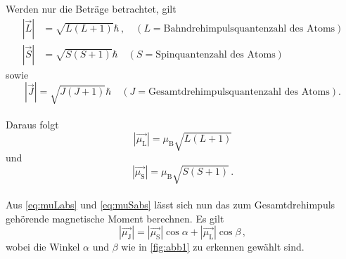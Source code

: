Werden nur die Beträge betrachtet, gilt
\begin{align}
    |\vec{L}| &= \sqrt{L(L + 1)} \hbar \,, \quad (L = \text{Bahndrehimpulsquantenzahl des Atoms}) 
    \label{eq:Labs} \\
    |\vec{S}| &= \sqrt{S(S + 1)} \hbar \quad (S = \text{Spinquantenzahl des Atoms})
    \label{eq:Sabs}
\end{align}
sowie
\begin{equation*}
    |\vec{J}| = \sqrt{J(J + 1)} \hbar \quad (J = \text{Gesamtdrehimpulsquantenzahl des Atoms}).
    \label{eq:Jabs}
\end{equation*} \\

Daraus folgt
\begin{equation}
    |\vec{\mu_\text{L}}| = \mu_\text{B} \sqrt{L(L + 1)}
    \label{eq:muLabs}
\end{equation}
und
\begin{equation}
    |\vec{\mu_\text{S}}| = \mu_\text{B} \sqrt{S(S + 1)} \,.
    \label{eq:muSabs}
\end{equation} \\

Aus \eqref{eq:muLabs} und \eqref{eq:muSabs} lässt sich nun das zum Gesamtdrehimpuls gehörende magnetische Moment
berechnen.
Es gilt
\begin{equation*}
    |\vec{\mu_\text{J}}| = |\vec{\mu_\text{S}}| \cos \alpha + |\vec{\mu_\text{L}}| \cos\beta \,,
\end{equation*}
wobei die Winkel $\alpha$ und $\beta$ wie in \autoref{fig:abb1} zu erkennen gewählt sind.

